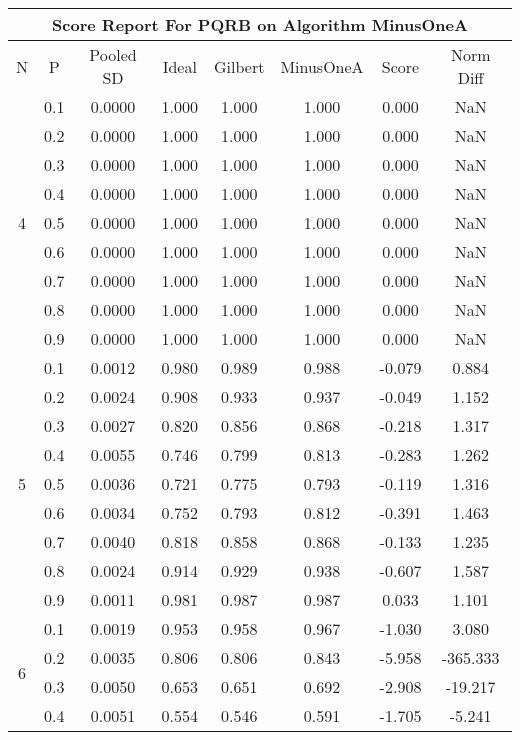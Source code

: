 \documentclass[11pt,a4paper]{report}
\begin{document}
\begin{longtable}{ | c | c || c | c | c | c | c | c | }
\hline
\multicolumn{8}{|c|}{ Score Report For PQRB on Algorithm MinusOneA} \\
\hline
N & P & Pooled SD &  Ideal &  Gilbert & MinusOneA  & Score & Norm Diff \\
 \hline
 \hline
 \endhead
\multirow{9}{*}{4} & 0.1 & 0.0000 & 1.000 & 1.000 & 1.000 & 0.000 & NaN \\
 & 0.2 & 0.0000 & 1.000 & 1.000 & 1.000 & 0.000 & NaN \\
 & 0.3 & 0.0000 & 1.000 & 1.000 & 1.000 & 0.000 & NaN \\
 & 0.4 & 0.0000 & 1.000 & 1.000 & 1.000 & 0.000 & NaN \\
 & 0.5 & 0.0000 & 1.000 & 1.000 & 1.000 & 0.000 & NaN \\
 & 0.6 & 0.0000 & 1.000 & 1.000 & 1.000 & 0.000 & NaN \\
 & 0.7 & 0.0000 & 1.000 & 1.000 & 1.000 & 0.000 & NaN \\
 & 0.8 & 0.0000 & 1.000 & 1.000 & 1.000 & 0.000 & NaN \\
 & 0.9 & 0.0000 & 1.000 & 1.000 & 1.000 & 0.000 & NaN \\
 \hline
\multirow{9}{*}{5} & 0.1 & 0.0012 & 0.980 & 0.989 & 0.988 & -0.079 & 0.884 \\
 & 0.2 & 0.0024 & 0.908 & 0.933 & 0.937 & -0.049 & 1.152 \\
 & 0.3 & 0.0027 & 0.820 & 0.856 & 0.868 & -0.218 & 1.317 \\
 & 0.4 & 0.0055 & 0.746 & 0.799 & 0.813 & -0.283 & 1.262 \\
 & 0.5 & 0.0036 & 0.721 & 0.775 & 0.793 & -0.119 & 1.316 \\
 & 0.6 & 0.0034 & 0.752 & 0.793 & 0.812 & -0.391 & 1.463 \\
 & 0.7 & 0.0040 & 0.818 & 0.858 & 0.868 & -0.133 & 1.235 \\
 & 0.8 & 0.0024 & 0.914 & 0.929 & 0.938 & -0.607 & 1.587 \\
 & 0.9 & 0.0011 & 0.981 & 0.987 & 0.987 & 0.033 & 1.101 \\
 \hline
\multirow{9}{*}{6} & 0.1 & 0.0019 & 0.953 & 0.958 & 0.967 & -1.030 & 3.080 \\
 & 0.2 & 0.0035 & 0.806 & 0.806 & 0.843 & -5.958 & -365.333 \\
 & 0.3 & 0.0050 & 0.653 & 0.651 & 0.692 & -2.908 & -19.217 \\
 & 0.4 & 0.0051 & 0.554 & 0.546 & 0.591 & -1.705 & -5.241 \\

\end{longtable}
\end{document}
